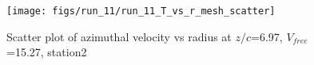 \begin{figure}[H]
\centering
\texttt{[image: figs/run\_11/run\_11\_T\_vs\_r\_mesh\_scatter]}
\caption{Scatter plot of azimuthal velocity vs radius at $z/c$=6.97, $V_{free}$=15.27, station2}
\label{fig:run_11_T_vs_r_mesh_scatter}
\end{figure}


